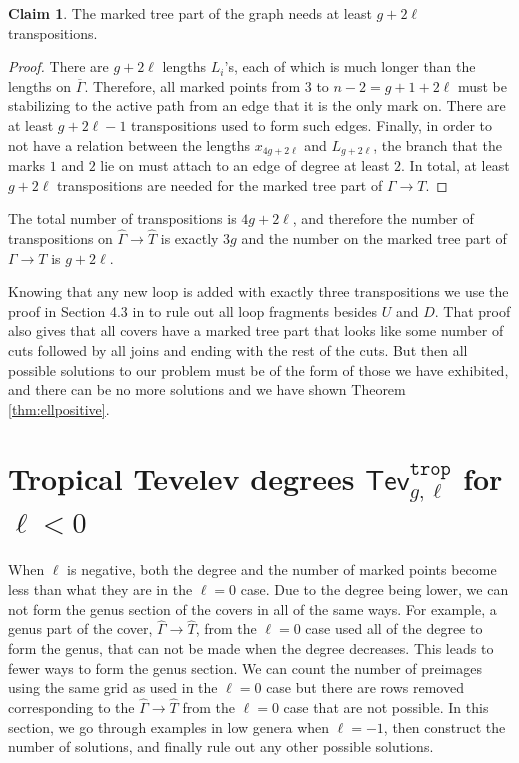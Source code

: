 \documentclass[11pt,reqno]{amsart}
\theoremstyle{definition}
\newtheorem{claim}[theorem]{Claim}
\newcommand\trop{{\mathtt{trop}}}
\newcommand{\gGamma}{\widehat{\Gamma}}
\newcommand{\gT}{\widehat{T}}
\newcommand{\Tev}{{\mathsf{Tev}}}
\begin{document}
\begin{claim}
    The marked tree part of the graph needs at least $g+2\ell$ transpositions.
\end{claim}
\begin{proof}
    There are $g+2\ell$ lengths $L_i$'s, each of which is much longer than the lengths on $\overline{\Gamma}$. Therefore, all marked points from $3$ to $n-2=g+1+2\ell$ must be stabilizing to the active path from an edge that it is the only mark on. There are at least $g+2\ell-1$ transpositions used to form such edges. Finally, in order to not have a relation between the lengths $x_{4g+2\ell}$ and $L_{g+2\ell}$, the branch that the marks $1$ and $2$ lie on must attach to an edge of degree at least $2$. In total, at least $g+2\ell$ transpositions are needed for the marked tree part of $\Gamma \to T$.
\end{proof}

The total number of transpositions is $4g+2\ell$, and therefore the number of transpositions on $\gGamma \to \gT$ is exactly $3g$ and the number on the marked tree part of $\Gamma \to T$ is $g+2\ell$.

Knowing that any new loop is added with exactly three transpositions we use the proof in Section 4.3 in \cite{troptev} to rule out all loop fragments besides $U$ and $D$. That proof also gives that all covers have a marked tree part that looks like some number of cuts followed by all joins and ending with the rest of the cuts. But then all possible solutions to our problem must be of the form of those we have exhibited, and there can be no more solutions and we have shown Theorem \ref{thm:ellpositive}.



\section{Tropical Tevelev degrees $\Tev^\trop_{g,\ell}$ for $\ell<0$}
\label{sec:ell<0}
When $\ell$ is negative, both the degree and the number of marked points become less than what they are in the $\ell=0$ case. Due to the degree being lower, we can not form the genus section of the covers in all of the same ways. For example, a genus part of the cover, $\gGamma \to \gT$, from the $\ell=0$ case used all of the degree to form the genus, that can not be made when the degree decreases. This leads to fewer ways to form the genus section. We can count the number of preimages using the same grid as used in the $\ell=0$ case but there are rows removed corresponding to the $\gGamma \to \gT$ from the $\ell=0$ case that are not possible. In this section, we go through examples in low genera when $\ell=-1$, then construct the number of solutions, and finally rule out any other possible solutions. 
\end{document}
